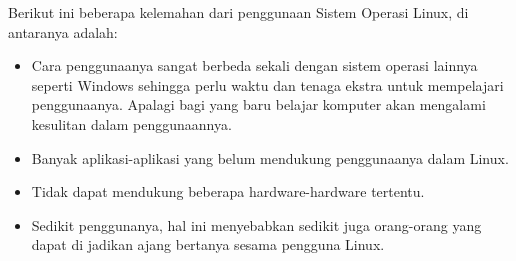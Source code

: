 Berikut ini beberapa kelemahan dari penggunaan Sistem Operasi Linux, di antaranya adalah:

\begin{itemize}

\item Cara penggunaanya sangat berbeda sekali dengan sistem operasi lainnya seperti Windows sehingga perlu waktu dan tenaga ekstra untuk mempelajari penggunaanya. Apalagi bagi yang baru belajar komputer akan mengalami kesulitan dalam penggunaannya.

\item Banyak aplikasi-aplikasi yang belum mendukung penggunaanya dalam Linux.

\item Tidak dapat mendukung beberapa hardware-hardware tertentu.

\item Sedikit penggunanya, hal ini menyebabkan sedikit juga orang-orang yang dapat di jadikan ajang bertanya sesama pengguna Linux.

\end{itemize}
